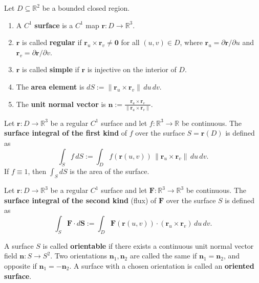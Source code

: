 \begin{definition}\label{def:surface_parameterization}
Let $D \subseteq \mathbb{R}^2$ be a bounded closed region.
\begin{enumerate}[label=(\roman*)]
    \item A $C^1$ \textbf{surface} is a $C^1$ map $\mathbf{r}: D \to \mathbb{R}^3$.
    \item $\mathbf{r}$ is called \textbf{regular} if $\mathbf{r}_u \times \mathbf{r}_v \neq \mathbf{0}$ for all $(u, v) \in D$, where $\mathbf{r}_u = \partial \mathbf{r}/\partial u$ and $\mathbf{r}_v = \partial \mathbf{r}/\partial v$.
    \item $\mathbf{r}$ is called \textbf{simple} if $\mathbf{r}$ is injective on the interior of $D$.
    \item The \textbf{area element} is $dS := \|\mathbf{r}_u \times \mathbf{r}_v\| \, du \, dv$.
    \item The \textbf{unit normal vector} is $\mathbf{n} := \frac{\mathbf{r}_u \times \mathbf{r}_v}{\|\mathbf{r}_u \times \mathbf{r}_v\|}$.
\end{enumerate}
\end{definition}

\begin{definition}\label{def:surface_integral_first_kind}
Let $\mathbf{r}: D \to \mathbb{R}^3$ be a regular $C^1$ surface and let $f: \mathbb{R}^3 \to \mathbb{R}$ be continuous. The \textbf{surface integral of the first kind} of $f$ over the surface $S = \mathbf{r}(D)$ is defined as
\[
\int_S f \, dS := \int_D f(\mathbf{r}(u, v)) \, \|\mathbf{r}_u \times \mathbf{r}_v\| \, du \, dv.
\]
If $f \equiv 1$, then $\int_S dS$ is the area of the surface.
\end{definition}

\begin{definition}\label{def:surface_integral_second_kind}
Let $\mathbf{r}: D \to \mathbb{R}^3$ be a regular $C^1$ surface and let $\mathbf{F}: \mathbb{R}^3 \to \mathbb{R}^3$ be continuous. The \textbf{surface integral of the second kind} (flux) of $\mathbf{F}$ over the surface $S$ is defined as
\[
\int_S \mathbf{F} \cdot d\mathbf{S} := \int_D \mathbf{F}(\mathbf{r}(u, v)) \cdot (\mathbf{r}_u \times \mathbf{r}_v) \, du \, dv.
\]
\end{definition}

\begin{definition}\label{def:surface_orientation}
A surface $S$ is called \textbf{orientable} if there exists a continuous unit normal vector field $\mathbf{n}: S \to S^2$. Two orientations $\mathbf{n}_1, \mathbf{n}_2$ are called the same if $\mathbf{n}_1 = \mathbf{n}_2$, and opposite if $\mathbf{n}_1 = -\mathbf{n}_2$. A surface with a chosen orientation is called an \textbf{oriented surface}.
\end{definition}

